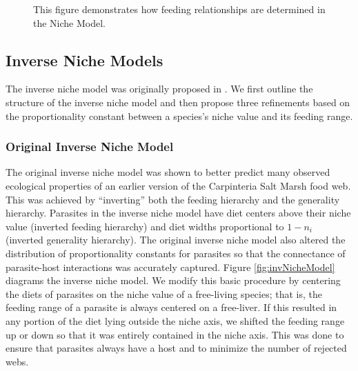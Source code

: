 \documentclass[/home/nkappler/Research/Dissertation/
 dissertation.tex]{subfiles}
\begin{document}
\begin{bibunit}
\begin{figure}
    \centering
    \caption[Niche model diagram]{This figure demonstrates how feeding relationships are determined
    in the Niche Model.\label{fig:nicheModel}}
\end{figure}


\subsection{Inverse Niche Models}
The inverse niche model was originally proposed in \cite{Warren2010}. We first
outline the structure of the inverse niche model and then propose three
refinements based on the proportionality constant between a species's niche value
and its feeding range.

\subsubsection{Original Inverse Niche Model} 

The original inverse niche model was shown to better predict many observed
ecological properties of an earlier version of the Carpinteria Salt Marsh food
web. This was achieved by ``inverting'' both the feeding hierarchy and the
generality hierarchy.  Parasites in the inverse niche model have diet centers
above their niche value (inverted feeding hierarchy) and diet widths
proportional to $1-n_i$ (inverted generality hierarchy). The original inverse
niche model also altered the distribution of proportionality constants for
parasites so that the connectance of parasite-host interactions was accurately
captured. Figure \ref{fig:invNicheModel} diagrams the inverse niche model. We
modify this basic procedure by centering the diets of parasites on the niche
value of a free-living species; that is, the feeding range of a parasite is
always centered on a free-liver. If this resulted in any portion of the diet
lying outside the niche axis, we shifted the feeding range up or down so that
it was entirely contained in the niche axis. This was done to ensure that
parasites always have a host and to minimize the number of rejected webs.



\end{bibunit}
\end{document}
